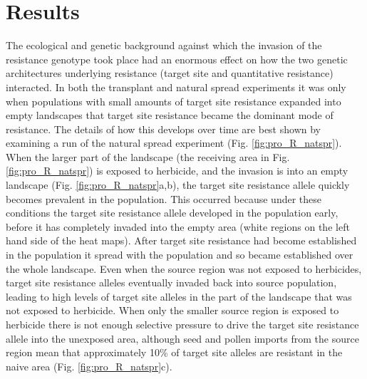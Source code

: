 \documentclass[10pt,letterpaper]{article}
\begin{document}
\section*{Results}
The ecological and genetic background against which the invasion of the resistance genotype took place had an enormous effect on how the two genetic architectures underlying resistance (target site and quantitative resistance) interacted. In both the transplant and natural spread experiments it was only when populations with small amounts of target site resistance expanded into empty landscapes that target site resistance became the dominant mode of resistance. The details of how this develops over time are best shown by examining a run of the natural spread experiment (Fig. \ref{fig:pro_R_natspr}). When the larger part of the landscape (the receiving area in Fig. \ref{fig:pro_R_natspr}) is exposed to herbicide, and the invasion is into an empty landscape (Fig. \ref{fig:pro_R_natspr}a,b), the target site resistance allele quickly becomes prevalent in the population. This occurred because under these conditions the target site resistance allele developed in the population early, before it has completely invaded into the empty area (white regions on the left hand side of the heat maps). After target site resistance had become established in the population it spread with the population and so became established over the whole landscape. Even when the source region was not exposed to herbicides, target site resistance alleles eventually invaded back into source population, leading to high levels of target site alleles in the part of the landscape that was not exposed to herbicide. When only the smaller source region is exposed to herbicide there is not enough selective pressure to drive the target site resistance allele into the unexposed area, although seed and pollen imports from the source region mean that approximately 10\% of target site alleles are resistant in the naive area (Fig. \ref{fig:pro_R_natspr}c).            
\end{document}
